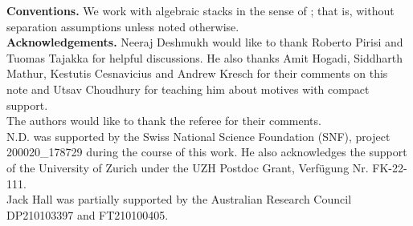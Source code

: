 \documentclass[10pt]{amsart}
\theoremstyle{plain}
\theoremstyle{definition}
\newcommand{\sX}{{\mathcal X}}
\newcommand{\sY}{{\mathcal Y}}
\begin{document}

\noindent\textbf{Conventions.} We work with algebraic stacks in the sense of \cite{stacks-project}; that is, without separation assumptions unless noted otherwise.\\

\noindent\textbf{Acknowledgements.} Neeraj Deshmukh would like to thank Roberto Pirisi and Tuomas Tajakka for helpful discussions. He also thanks Amit Hogadi,  Siddharth Mathur, Kestutis Cesnavicius and Andrew Kresch for their comments on this note and Utsav Choudhury for teaching him about motives with compact support.\\
The authors would like to thank the referee for their comments.\\
N.D. was supported by the Swiss National Science Foundation (SNF), project 200020\_178729 during the course of this work. He also acknowledges the support of the University of Zurich under the UZH Postdoc Grant, Verf\"{u}gung Nr. FK-22-111.\\
Jack Hall was partially supported
by the Australian Research Council DP210103397 and FT210100405.







\end{document}
